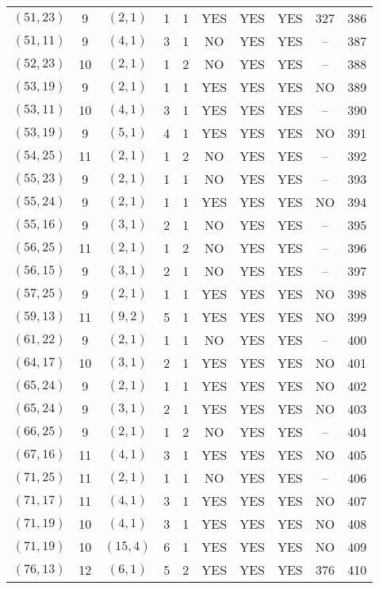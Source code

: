 \begin{longtable}{|c|c|c|c|c|c|c|c|c|c|}
$(51, 23)$ & 9 & $(2, 1)$ & 1 & 1 & YES & YES & YES & 327 & 386\\
$(51, 11)$ & 9 & $(4, 1)$ & 3 & 1 & NO & YES & YES & -- & 387\\
$(52, 23)$ & 10 & $(2, 1)$ & 1 & 2 & NO & YES & YES & -- & 388\\
$(53, 19)$ & 9 & $(2, 1)$ & 1 & 1 & YES & YES & YES & NO & 389\\
$(53, 11)$ & 10 & $(4, 1)$ & 3 & 1 & YES & YES & YES & -- & 390\\
$(53, 19)$ & 9 & $(5, 1)$ & 4 & 1 & YES & YES & YES & NO & 391\\
$(54, 25)$ & 11 & $(2, 1)$ & 1 & 2 & NO & YES & YES & -- & 392\\
$(55, 23)$ & 9 & $(2, 1)$ & 1 & 1 & NO & YES & YES & -- & 393\\
$(55, 24)$ & 9 & $(2, 1)$ & 1 & 1 & YES & YES & YES & NO & 394\\
$(55, 16)$ & 9 & $(3, 1)$ & 2 & 1 & NO & YES & YES & -- & 395\\
$(56, 25)$ & 11 & $(2, 1)$ & 1 & 2 & NO & YES & YES & -- & 396\\
$(56, 15)$ & 9 & $(3, 1)$ & 2 & 1 & NO & YES & YES & -- & 397\\
$(57, 25)$ & 9 & $(2, 1)$ & 1 & 1 & YES & YES & YES & NO & 398\\
$(59, 13)$ & 11 & $(9, 2)$ & 5 & 1 & YES & YES & YES & NO & 399\\
$(61, 22)$ & 9 & $(2, 1)$ & 1 & 1 & NO & YES & YES & -- & 400\\
$(64, 17)$ & 10 & $(3, 1)$ & 2 & 1 & YES & YES & YES & NO & 401\\
$(65, 24)$ & 9 & $(2, 1)$ & 1 & 1 & YES & YES & YES & NO & 402\\
$(65, 24)$ & 9 & $(3, 1)$ & 2 & 1 & YES & YES & YES & NO & 403\\
$(66, 25)$ & 9 & $(2, 1)$ & 1 & 2 & NO & YES & YES & -- & 404\\
$(67, 16)$ & 11 & $(4, 1)$ & 3 & 1 & YES & YES & YES & NO & 405\\
$(71, 25)$ & 11 & $(2, 1)$ & 1 & 1 & NO & YES & YES & -- & 406\\
$(71, 17)$ & 11 & $(4, 1)$ & 3 & 1 & YES & YES & YES & NO & 407\\
$(71, 19)$ & 10 & $(4, 1)$ & 3 & 1 & YES & YES & YES & NO & 408\\
$(71, 19)$ & 10 & $(15, 4)$ & 6 & 1 & YES & YES & YES & NO & 409\\
$(76, 13)$ & 12 & $(6, 1)$ & 5 & 2 & YES & YES & YES & 376 & 410\\

\end{longtable}
